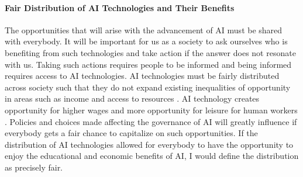 \documentclass[12pt]{article}
\begin{document}
\paragraph{Fair Distribution of AI Technologies and Their Benefits\\}
The opportunities that will arise with the advancement of AI must be shared with everybody. It will be important for us as a society to ask ourselves who is benefiting from such technologies and take action if the answer does not resonate with us. Taking such actions requires people to be informed and being informed requires access to AI technologies. AI technologies must be fairly distributed across society such that they do not expand existing inequalities of opportunity in areas such as income and access to resources \cite[pg. 10]{twentythirty}. AI technology creates opportunity for higher wages and more opportunity for leisure for human workers \cite[pg. 2]{gov}. Policies and choices made affecting the governance of AI will greatly influence if everybody gets a fair chance to capitalize on such opportunities. If the distribution of AI technologies allowed for everybody to have the opportunity to enjoy the educational and economic benefits of AI, I would define the distribution as precisely fair. 
\end{document}
